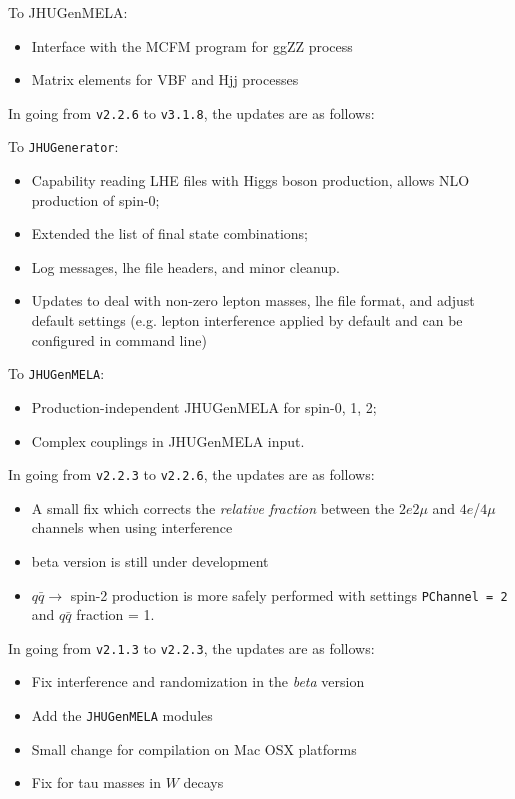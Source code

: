 \documentclass[aps,superscriptaddress,nofootinbib]{revtex4}
\begin{document}
To JHUGenMELA:
\begin{itemize}
\item Interface with the MCFM program for ggZZ process
\item Matrix elements for VBF and Hjj processes
\end{itemize}


\noindent
In going from \verb|v2.2.6| to \verb|v3.1.8|, the updates are as follows:

To \verb|JHUGenerator|:
\begin{itemize}
\item Capability reading LHE files with Higgs boson production, allows NLO production of spin-0;
\item Extended the list of final state combinations;
\item Log messages, lhe file headers, and minor cleanup.
\item Updates to deal with non-zero lepton masses, lhe file format, and adjust default settings (e.g. lepton interference applied by default and can be configured in command line)
\end{itemize}

To \verb|JHUGenMELA|:
\begin{itemize}
\item Production-independent JHUGenMELA for spin-0, 1, 2;
\item Complex couplings in JHUGenMELA input.
\end{itemize}

\noindent
In going from \verb|v2.2.3| to \verb|v2.2.6|, the updates are as follows:
\begin{itemize}
\item A small fix which corrects the {\it relative fraction} between the $2e2\mu$ and $4e$/$4\mu$ channels when using interference
\item beta version is still under development
\item $q\bar{q} \to$ spin-2 production is more safely performed with settings \verb|PChannel = 2| and $q\bar{q}$ fraction = 1.
\end{itemize}

\noindent
In going from \verb|v2.1.3| to \verb|v2.2.3|, the updates are as follows:
\begin{itemize}
\item Fix interference and randomization in the {\it{beta}} version
\item Add the \verb|JHUGenMELA| modules
\item Small change for compilation on Mac OSX platforms
\item Fix for tau masses in $W$ decays
\end{itemize}
\end{document}
